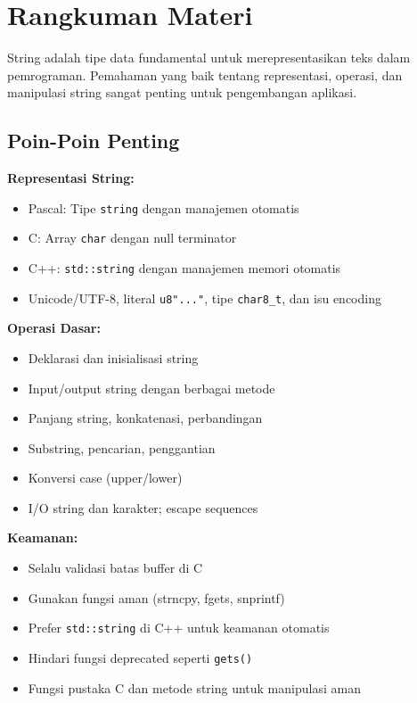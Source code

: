 \documentclass[../main.tex]{subfiles}
\begin{document}
\section{Rangkuman Materi}

String adalah tipe data fundamental untuk merepresentasikan teks dalam pemrograman. Pemahaman yang baik tentang representasi, operasi, dan manipulasi string sangat penting untuk pengembangan aplikasi.

\subsection{Poin-Poin Penting}

\textbf{Representasi String:}
\begin{itemize}
  \item Pascal: Tipe \texttt{string} dengan manajemen otomatis
  \item C: Array \texttt{char} dengan null terminator
  \item C++: \texttt{std::string} dengan manajemen memori otomatis
  \item Unicode/UTF-8, literal \texttt{u8"..."}, tipe \texttt{char8\_t}, dan isu encoding
\end{itemize}

\textbf{Operasi Dasar:}
\begin{itemize}
  \item Deklarasi dan inisialisasi string
  \item Input/output string dengan berbagai metode
  \item Panjang string, konkatenasi, perbandingan
  \item Substring, pencarian, penggantian
  \item Konversi case (upper/lower)
  \item I/O string dan karakter; escape sequences
\end{itemize}

\textbf{Keamanan:}
\begin{itemize}
  \item Selalu validasi batas buffer di C
  \item Gunakan fungsi aman (strncpy, fgets, snprintf)
  \item Prefer \texttt{std::string} di C++ untuk keamanan otomatis
  \item Hindari fungsi deprecated seperti \texttt{gets()}
  \item Fungsi pustaka C dan metode string untuk manipulasi aman
\end{itemize}
\end{document}
